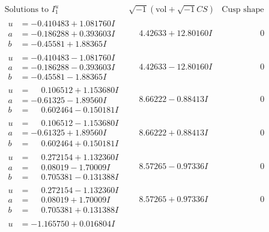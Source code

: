 \documentclass[1p]{elsarticle_modified}
\theoremstyle{definition}
\newcommand{\I}{\sqrt{-1}}
\begin{document}
$$\begin{array}{c|c|c}
\text{Solutions to }I^u_{1}& \I (\text{vol} + \sqrt{-1}CS) & \text{Cusp shape}\\
 \hline 
\begin{aligned}
u &= -0.410483 + 1.081760 I \\
a &= -0.186288 + 0.393603 I \\
b &= -0.45581 + 1.88365 I\end{aligned}
 & \phantom{-}4.42633 + 12.80160 I & \phantom{-0.000000 } 0 \\ \hline\begin{aligned}
u &= -0.410483 - 1.081760 I \\
a &= -0.186288 - 0.393603 I \\
b &= -0.45581 - 1.88365 I\end{aligned}
 & \phantom{-}4.42633 - 12.80160 I & \phantom{-0.000000 } 0 \\ \hline\begin{aligned}
u &= \phantom{-}0.106512 + 1.153680 I \\
a &= -0.61325 - 1.89560 I \\
b &= \phantom{-}0.602464 - 0.150181 I\end{aligned}
 & \phantom{-}8.66222 - 0.88413 I & \phantom{-0.000000 } 0 \\ \hline\begin{aligned}
u &= \phantom{-}0.106512 - 1.153680 I \\
a &= -0.61325 + 1.89560 I \\
b &= \phantom{-}0.602464 + 0.150181 I\end{aligned}
 & \phantom{-}8.66222 + 0.88413 I & \phantom{-0.000000 } 0 \\ \hline\begin{aligned}
u &= \phantom{-}0.272154 + 1.132360 I \\
a &= \phantom{-}0.08019 - 1.70009 I \\
b &= \phantom{-}0.705381 - 0.131388 I\end{aligned}
 & \phantom{-}8.57265 - 0.97336 I & \phantom{-0.000000 } 0 \\ \hline\begin{aligned}
u &= \phantom{-}0.272154 - 1.132360 I \\
a &= \phantom{-}0.08019 + 1.70009 I \\
b &= \phantom{-}0.705381 + 0.131388 I\end{aligned}
 & \phantom{-}8.57265 + 0.97336 I & \phantom{-0.000000 } 0 \\ \hline\begin{aligned}
u &= -1.165750 + 0.016804 I \\

\end{aligned}
\end{array}$$
\end{document}
